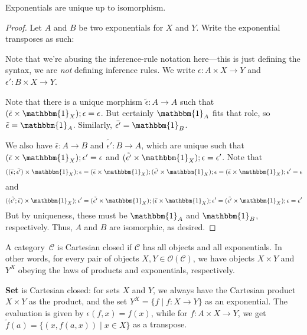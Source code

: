 \documentclass{lecturenotes}
\newcommand{\obj}[1]{\ensuremath{\mathcal{O}(#1)}}
\newcommand{\id}[1][]{\ensuremath{\mathbbm{1}_{#1}}}
\newcommand{\Set}{\textbf{Set}\xspace}
\begin{document}
\begin{thm}
  Exponentials are unique up to isomorphism.
\end{thm}
\begin{proof}
  Let $A$ and $B$ be two exponentials for $X$ and $Y$.
  Write the exponential transposes as such:
  Note that we're abusing the inference-rule notation here---this is just defining the syntax, we are \emph{not} defining inference rules.
  We write $\epsilon : A \times X \to Y$ and $\epsilon' : B \times X \to Y$.

  Note that there is a unique morphism $\tilde{\epsilon} : A \to A$ such that $(\tilde{\epsilon} \times \id[X]); \epsilon = \epsilon$.
  But certainly $\id[A]$ fits that role, so $\tilde{\epsilon} = \id[A]$.
  Similarly, $\bar{\epsilon'} = \id[B]$.

  We also have $\bar{\epsilon} : A \to B$ and $\tilde{\epsilon'} : B \to A$, which are unique such that $(\bar{\epsilon} \times \id[X]); \epsilon' = \epsilon$ and $(\tilde{\epsilon'} \times \id[X]); \epsilon = \epsilon'$.
  Note that $$((\bar{\epsilon}; \tilde{\epsilon'}) \times \id[X]); \epsilon = (\bar{\epsilon} \times \id[X]); (\tilde{\epsilon'} \times \id[X]); \epsilon = (\bar{\epsilon} \times \id[X]); \epsilon' = \epsilon$$ and $$((\tilde{\epsilon'}; \bar{\epsilon}) \times \id[X]); \epsilon' = (\tilde{\epsilon'} \times \id[X]); (\bar{\epsilon} \times \id[X]); \epsilon' = (\tilde{\epsilon'} \times \id[X]); \epsilon = \epsilon'$$
  But by uniqueness, these must be $\id[A]$ and $\id[B]$, respectively.
  Thus, $A$ and $B$ are isomorphic, as desired.
\end{proof}

\begin{defn}
  A category~$\mathcal{C}$ is Cartesian closed if $\mathcal{C}$ has all objects and all exponentials.
  In other words, for every pair of objects $X, Y \in \obj{\mathcal{C}}$, we have objects $X \times Y$ and $Y^X$ obeying the laws of products and exponentials, respectively.
\end{defn}

\Set is Cartesian closed: for sets $X$ and $Y$, we always have the Cartesian product $X \times Y$ as the product, and the set $Y^X = \{f \mid f : X \to Y\}$ as an exponential.
The evaluation is given by $\epsilon(f, x) = f(x)$, while for $f : A \times X \to Y$, we get $\tilde{f}(a) = \{(x, f(a, x)) \mid x \in X\}$ as a transpose.
\end{document}
